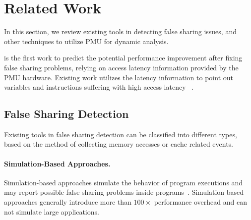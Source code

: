 \section{Related Work}

\label{sec:relatedwork}

 
In this section, we review existing tools in detecting false sharing issues, and other techniques to utilize PMU for dynamic analysis.

\cheetah{} is the first work to predict the potential performance improvement after fixing false sharing problems, relying on access latency information provided by the PMU hardware. Existing work utilizes the latency information to point out variables and instructions suffering with high access latency ~\cite{ibs-sc, ibs-pact}. 

\subsection{False Sharing Detection}

Existing tools in false sharing detection can be classified into different types, based on the method of collecting memory accesses or cache related events. 

\paragraph{Simulation-Based Approaches.} Simulation-based approaches simulate the behavior of program executions and may report possible false sharing problems inside programs~\cite{falseshare:simulator}. Simulation-based approaches generally introduce more than $100\times$ performance overhead and can not simulate large applications. 

